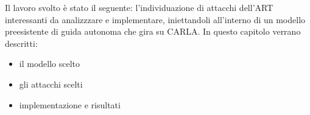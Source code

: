 Il lavoro svolto è stato il seguente:  l'individuazione di attacchi dell'ART interessanti da analizzzare e implementare, iniettandoli all'interno di un modello preesistente di guida
autonoma che gira su CARLA. In questo capitolo verrano descritti:\begin{itemize}
    \item il modello scelto
    \item gli attacchi scelti
    \item implementazione e risultati
\end{itemize}





